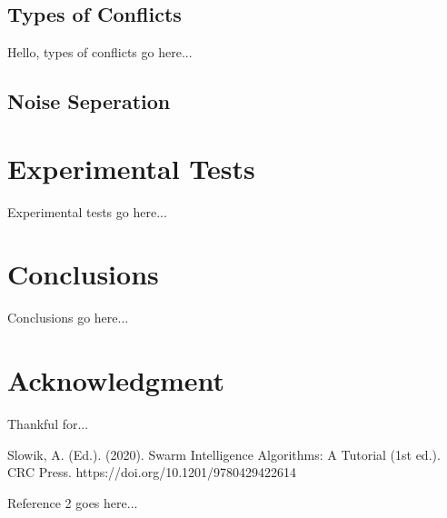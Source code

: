 \documentclass[conference]{IEEEtran}
\begin{document}
    \subsection{Types of Conflicts}
    Hello, types of conflicts go here...

    \subsection{Noise Seperation}


\section{Experimental Tests}
Experimental tests go here...

\section{Conclusions}
Conclusions go here...

\section*{Acknowledgment}
Thankful for...

\begin{thebibliography}{1}
    
    
    Slowik, A. (Ed.). (2020). Swarm Intelligence Algorithms: A Tutorial (1st ed.). CRC Press. https://doi.org/10.1201/9780429422614
    
    Reference 2 goes here...
    
\end{thebibliography}
\end{document}
